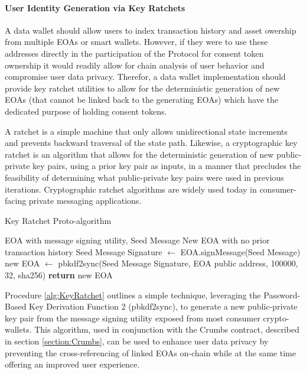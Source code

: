 \paragraph{User Identity Generation via Key Ratchets}
\label{section:UserIdentityGeneration}

A data wallet should allow users to index transaction history and asset owership from multiple EOAs or smart wallets. However, if they were to use these addresses directly in the participation of 
the Protocol for consent token ownership it would readily allow for chain analysis of user behavior and compromise user data privacy. Therefor, a data wallet
implementation should provide key ratchet utilities to allow for the deterministic generation of new EOAs (that cannot be linked back to the generating EOAs) which have the dedicated purpose of holding consent tokens. 

A ratchet is a simple machine that only allows unidirectional state increments and prevents backward traversal of the state path. Likewise, a cryptographic
key ratchet is an algorithm that allows for the deterministic generation of new public-private key pairs, using a prior key pair as inputs, in a manner that precludes the feasibility of determining
what public-private key pairs were used in previous iterations. Cryptographic ratchet algorithms are widely used today in consumer-facing private messaging applications.

\begin{algorithm}
\caption{Key Ratchet Proto-algorithm}
\label{alg:KeyRatchet}
    \begin{algorithmic}
        \Require EOA with message signing utility, Seed Message
        \Ensure New EOA with no prior transaction history
        \State Seed Message Signature $\gets$ EOA.signMessage(Seed Message)
        \State new EOA $\gets$ pbkdf2sync(Seed Message Signature, EOA public address, 100000, 32, sha256)
        \State \textbf{return} new EOA
    \end{algorithmic}
\end{algorithm}

Procedure \ref{alg:KeyRatchet} outlines a simple technique, leveraging the Password-Based Key Derivation Function 2 (pbkdf2sync), to generate a new public-private key pair from the message signing utility exposed from most consumer crypto-wallets. This 
algorithm, used in conjunction with the Crumbs contract, described in section \ref{section:Crumbs}, can be used to enhance user data privacy by preventing the cross-referencing of linked EOAs on-chain while at the same time offering an improved user
experience. 


